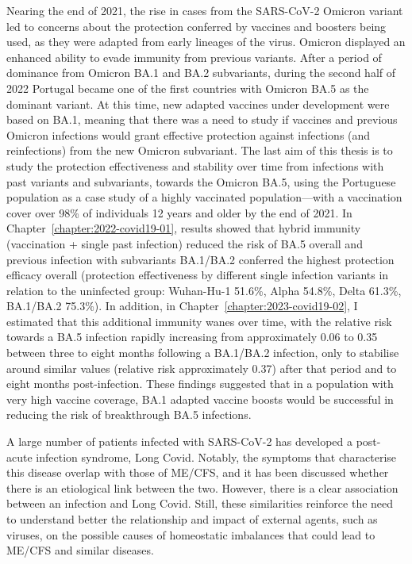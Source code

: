 \bsni
Nearing the end of 2021, the rise in cases from the SARS-CoV-2 Omicron variant led to concerns about the protection conferred by vaccines and boosters being used, as they were adapted from early lineages of the virus. Omicron displayed an enhanced ability to evade immunity from previous variants. After a period of dominance from Omicron BA.1 and BA.2 subvariants, during the second half of 2022 Portugal became one of the first countries with Omicron BA.5 as the dominant variant. At this time, new adapted vaccines under development were based on BA.1, meaning that there was a need to study if vaccines and previous Omicron infections would grant effective protection against infections (and reinfections) from the new Omicron subvariant.
The last aim of this thesis is to study the protection effectiveness and stability over time from infections with past variants and subvariants, towards the Omicron BA.5, using the Portuguese population as a case study of a highly vaccinated population---with a vaccination cover over 98\% of individuals 12 years and older by the end of 2021. In Chapter~\ref{chapter:2022-covid19-01}, results showed that hybrid immunity (vaccination + single past infection) reduced the risk of BA.5 overall and previous infection with subvariants BA.1/BA.2 conferred the highest protection efficacy overall (protection effectiveness by different single infection variants in relation to the uninfected group: Wuhan-Hu-1 51.6\%, Alpha 54.8\%, Delta 61.3\%, BA.1/BA.2 75.3\%). In addition, in Chapter~\ref{chapter:2023-covid19-02}, I estimated that this additional immunity wanes over time, with the relative risk towards a BA.5 infection rapidly increasing from approximately 0.06 to 0.35 between three to eight months following a BA.1/BA.2 infection, only to stabilise around similar values (relative risk approximately 0.37) after that period and to eight months post-infection. These findings suggested that in a population with very high vaccine coverage, BA.1 adapted vaccine boosts would be successful in reducing the risk of breakthrough  BA.5 infections.

\bsni
A large number of patients infected with SARS-CoV-2 has developed a post-acute infection syndrome, Long Covid. Notably, the symptoms that characterise this disease overlap with those of ME/CFS, and it has been discussed whether there is an etiological link between the two. However, there is a clear association between an infection and Long Covid. Still, these similarities reinforce the need to understand better the relationship and impact of external agents, such as viruses, on the possible causes of homeostatic imbalances that could lead to ME/CFS and similar diseases.

